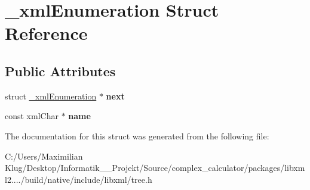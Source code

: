 \hypertarget{struct__xml_enumeration}{}\section{\+\_\+xml\+Enumeration Struct Reference}
\label{struct__xml_enumeration}
\subsection*{Public Attributes}
\begin{DoxyCompactItemize}
\item 
\mbox{\label{struct__xml_enumeration_a168deadc881e76af7e2ead0a1348f8cb}} 
struct \mbox{\hyperlink{struct__xml_enumeration}{\+\_\+xml\+Enumeration}} $\ast$ {\bfseries next}
\item 
\mbox{\label{struct__xml_enumeration_ac88e7e3719444b48a74d79a374455d5f}} 
const xml\+Char $\ast$ {\bfseries name}
\end{DoxyCompactItemize}


The documentation for this struct was generated from the following file\+:\begin{DoxyCompactItemize}
\item 
C\+:/\+Users/\+Maximilian Klug/\+Desktop/\+Informatik\+\_\+\_\+\+Projekt/\+Source/complex\+\_\+calculator/packages/libxml2..../build/native/include/libxml/tree.\+h\end{DoxyCompactItemize}
